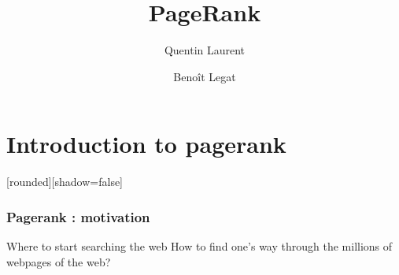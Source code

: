 \documentclass[10pt]{beamer}
\title{PageRank}
\author{
  Quentin Laurent
  \and
  Benoît Legat
}
\begin{document}
\begin{frame}
  \maketitle
\end{frame}
\begin{frame}
  \tableofcontents
\end{frame}
\section{Introduction to pagerank}
[rounded][shadow=false]
\begin{frame}
  \frametitle{Pagerank : motivation}
  \begin{block}{Where to start searching the web}
    How to find one's way through the millions of webpages of the web?
  \end{block}
\end{frame}
\end{document}
